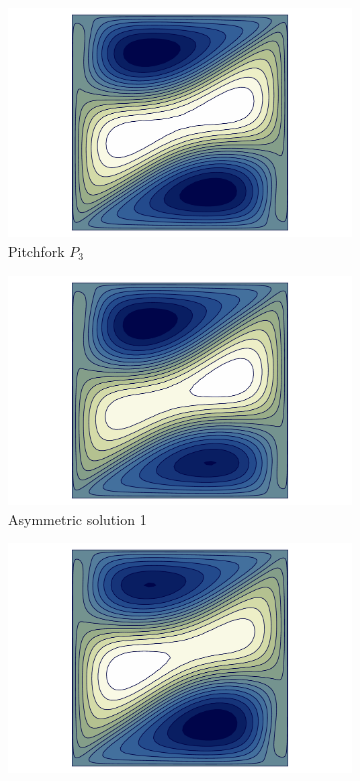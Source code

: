 \begin{figure}[h!]
\centering
\begin{subfigure}[b]{0.25\textwidth}
  \centering
  \includegraphics[trim={3.6cm 0 3.6cm 0},clip,width=\textwidth]{figs/psi_Re353.356_pf3.pdf}
  \caption{Pitchfork $P_3$}
\end{subfigure}
\begin{subfigure}[b]{0.25\textwidth}
  \centering
  \includegraphics[trim={3.6cm 0 3.6cm 0},clip,width=\textwidth]{figs/psi_Re375.000_branch2_u_t_smaller.pdf}
  \caption{Asymmetric solution 1}
\end{subfigure}
\begin{subfigure}[b]{0.25\textwidth}
  \centering
  \includegraphics[trim={3.6cm 0 3.6cm 0},clip,width=\textwidth]{figs/psi_Re375.000_branch2_u_t_bigger.pdf}

\end{subfigure}
\end{figure}
